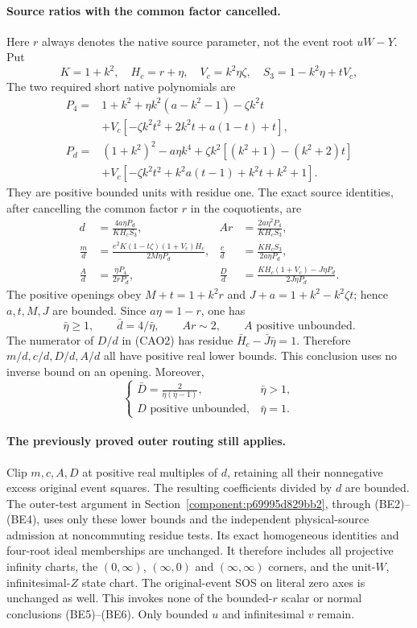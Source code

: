 \paragraph{Source ratios with the common factor cancelled.}
Here $r$ always denotes the native source parameter, not the event root
$uW-Y$. Put
\[
 K=1+k^2,\quad H_c=r+\eta,\quad V_c=k^2\eta\zeta,\quad
 S_3=1-k^2\eta+tV_c,
\]
The two required short native polynomials are
\begin{align*}
P_4={}&1+k^2+\eta k^2(a-k^2-1)-\zeta k^2t\\
 &+V_c[-\zeta k^2t^2+2k^2t+a(1-t)+t],\\
P_d={}&(1+k^2)^2-a\eta k^4
 +\zeta k^2[(k^2+1)-(k^2+2)t]\\
 &+V_c[-\zeta k^2t^2+k^2a(t-1)+k^2t+k^2+1].
\end{align*}
They are positive bounded units with residue one. The exact source
identities, after cancelling the common factor $r$ in the coquotients,
are
\begin{align*}
 d&=\frac{4a\eta P_d}{KH_cS_3},&
 Ar&=\frac{2a\eta^2P_4}{KH_cS_3},\\
 \frac md&=\frac{e^2K(1-t\zeta)(1+V_c)H_c}{2M\eta P_d},&
 \frac cd&=\frac{KH_cS_3}{2a\eta P_d},\\
 \frac Ad&=\frac{\eta P_4}{2rP_d},&
 \frac Dd&=\frac{KH_c(1+V_c)-J\eta P_d}{2J\eta P_d}.
 \tag{CAO2}
\end{align*}
The positive openings obey
$M+t=1+k^2r$ and $J+a=1+k^2-k^2\zeta t$; hence $a,t,M,J$ are
bounded. Since $a\eta=1-r$, one has
\[
 \bar\eta\ge1,\qquad \bar d=4/\bar\eta,\qquad Ar\sim2,
 \qquad A\text{ positive unbounded}.
 \tag{CAO3}
\]
The numerator of $D/d$ in (CAO2) has residue
$\bar H_c-\bar J\bar\eta=1$. Therefore $m/d,c/d,D/d,A/d$ all have
positive real lower bounds. This conclusion uses no inverse bound on
an opening. Moreover,
\[
 \begin{cases}
 \displaystyle \bar D=\frac{2}{\bar\eta(\bar\eta-1)},
       &\bar\eta>1,\\[4pt]
 D\text{ positive unbounded},&\bar\eta=1.
 \end{cases}
 \tag{CAO4}
\]

\paragraph{The previously proved outer routing still applies.}
Clip $m,c,A,D$ at positive real multiples of $d$, retaining all their
nonnegative excess original event squares. The resulting coefficients
divided by $d$ are bounded. The outer-test argument in
Section~\ref{component:p69995d829bb2}, through (BE2)--(BE4), uses only
these lower bounds and the independent physical-source admission at
noncommuting residue tests. Its exact homogeneous identities and
four-root ideal memberships are unchanged. It therefore includes all
projective infinity charts, the $(0,\infty)$, $(\infty,0)$ and
$(\infty,\infty)$ corners, and the unit-$W$, infinitesimal-$Z$ state
chart. The original-event SOS on literal zero axes is unchanged as
well. This invokes none of the bounded-$r$ scalar or normal conclusions
(BE5)--(BE6). Only bounded $u$ and infinitesimal $v$ remain.

